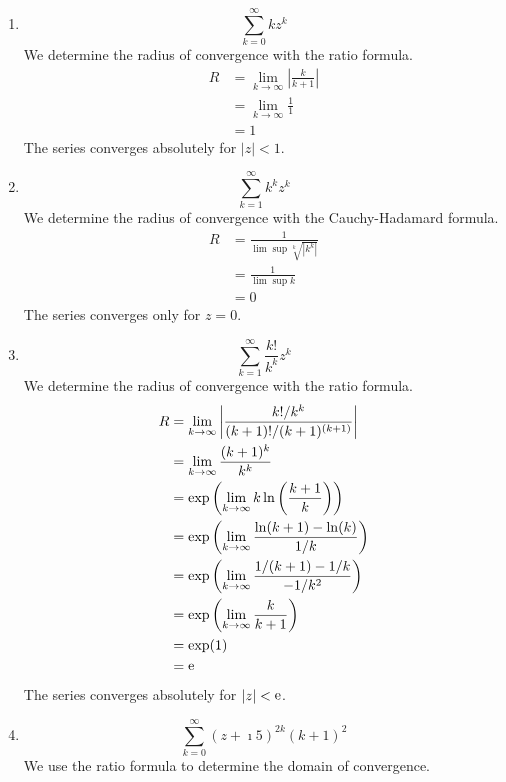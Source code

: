 {\begin{Solution}
  \label{solution circle of convergence k zk}
  \begin{enumerate}
  \item 
    \[
    \sum_{k = 0}^\infty k z^k
    \]
    We determine the radius of convergence with the ratio formula.
    \begin{align*}
      R 
      &= \lim_{k \to \infty} \left| \frac{k}{k+1} \right|
      \\
      &= \lim_{k \to \infty} \frac{1}{1}
      \\
      &= 1
    \end{align*}
    The series converges absolutely for $|z| < 1$.
  \item 
    \[
    \sum_{k = 1}^\infty k^k z^k
    \]
    We determine the radius of convergence with the Cauchy-Hadamard formula.
    \begin{align*}
      R
      &= \frac{ 1 }{ \lim \sup \sqrt[k]{ \left| k^k \right| } }
      \\
      &= \frac{ 1 }{ \lim \sup k }
      \\
      &= 0
    \end{align*}
    The series converges only for $z = 0$.
  \item 
    \[
    \sum_{k = 1}^\infty \frac{k!}{k^k} z^k
    \]
    We determine the radius of convergence with the ratio formula.
    \begin{align*}
      R 
      &= \lim_{k \to \infty} \left| \frac{k! / k^k}{(k + 1)! / (k + 1)^{(k + 1)}} \right|
      \\
      &= \lim_{k \to \infty} \frac{(k + 1)^k}{k^k}
      \\
      &= \exp \left( \lim_{k \to \infty} k \ln \left( \frac{k + 1}{k} \right) \right)
      \\
      &= \exp \left( \lim_{k \to \infty} \frac{ \ln(k + 1) - \ln(k) }{ 1 / k } \right)
      \\
      &= \exp \left( \lim_{k \to \infty} \frac{ 1 / (k + 1) - 1 / k }{ - 1 / k^2 } \right)
      \\
      &= \exp \left( \lim_{k \to \infty} \frac{ k }{ k + 1 } \right)
      \\
      &= \exp(1)
      \\
      &= \mathop{\mathrm{e}}\nolimits
    \end{align*}
    The series converges absolutely for $|z| < \mathop{\mathrm{e}}\nolimits$.
  \item 
    \[
    \sum_{k = 0}^\infty (z + \imath 5)^{2 k} (k + 1)^2
    \]
    We use the ratio formula to determine the domain of convergence.

\end{enumerate}
\end{Solution}}

